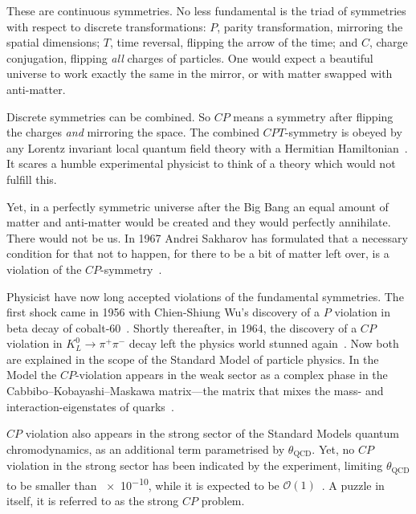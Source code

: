 These are continuous symmetries. No less fundamental is the triad of symmetries with respect to discrete transformations: $P$, parity transformation, mirroring the spatial dimensions; $T$, time reversal, flipping the arrow of the time; and $C$, charge conjugation, flipping \emph{all} charges of particles. One would expect a beautiful universe to work exactly the same in the mirror, or with matter swapped with anti-matter.

Discrete symmetries can be combined. So $CP$ means a symmetry after flipping the charges \emph{and} mirroring the space. The combined $CPT$-symmetry is obeyed by any Lorentz invariant local quantum field theory with a Hermitian Hamiltonian~\cite{Sachs1987}. It scares a humble experimental physicist to think of a theory which would not fulfill this.

Yet, in a perfectly symmetric universe after the Big Bang an equal amount of matter and anti-matter would be created and they would perfectly annihilate. There would not be us.
In 1967 Andrei Sakharov
has formulated that a necessary condition for that not to happen, for there to be a bit of matter left over, is a violation of the $CP$-symmetry~\cite{0038-5670-34-5-A08}.

Physicist have now long accepted violations of the fundamental symmetries.
The first shock came in 1956 with Chien-Shiung Wu's discovery of a $P$ violation in beta decay of cobalt-60~\cite{PhysRev.105.1413}. Shortly thereafter, in 1964, the discovery of a $CP$ violation in $K^0_L \rightarrow \pi^+ \pi^-$ decay left the physics world stunned again~\cite{PhysRevLett.13.138}. Now both are explained in the scope of the Standard Model of particle physics. In the Model the $CP$-violation appears in the weak sector as a complex phase in the Cabbibo--Kobayashi--Maskawa matrix---the matrix that mixes the mass- and interaction-eigenstates of quarks~\cite{doi:10.1143/PTP.49.652}.

$CP$ violation also appears in the strong sector of the Standard Models quantum chromodynamics, as an additional term parametrised by $\theta_\text{QCD}$. Yet, no $CP$ violation in the strong sector has been indicated by the experiment, limiting $\theta_\text{QCD}$ to be smaller than \num{e-10}, while it is expected to be $\mathcal{O}(1)$~\cite{PDG2016}. A puzzle in itself, it is referred to as the strong $CP$ problem.

